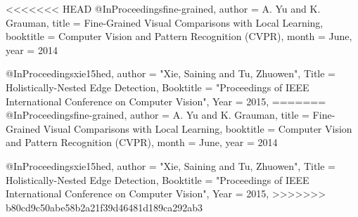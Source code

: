 <<<<<<< HEAD
@InProceedings{fine-grained,
  author = {A. Yu and K. Grauman},
  title = {{F}ine-{G}rained {V}isual {C}omparisons with {L}ocal {L}earning},
  booktitle = {Computer Vision and Pattern Recognition (CVPR)},
  month = {June},
  year = {2014}
}

@InProceedings{xie15hed,
  author = {"Xie, Saining and Tu, Zhuowen"},
  Title = {Holistically-Nested Edge Detection},
  Booktitle = "Proceedings of IEEE International Conference on Computer Vision",
  Year  = {2015},
}
=======
@InProceedings{fine-grained,
  author = {A. Yu and K. Grauman},
  title = {{F}ine-{G}rained {V}isual {C}omparisons with {L}ocal {L}earning},
  booktitle = {Computer Vision and Pattern Recognition (CVPR)},
  month = {June},
  year = {2014}
}

@InProceedings{xie15hed,
  author = {"Xie, Saining and Tu, Zhuowen"},
  Title = {Holistically-Nested Edge Detection},
  Booktitle = "Proceedings of IEEE International Conference on Computer Vision",
  Year  = {2015},
}
>>>>>>> b80cd9c50abe58b2a21f39d46481d189ca292ab3
